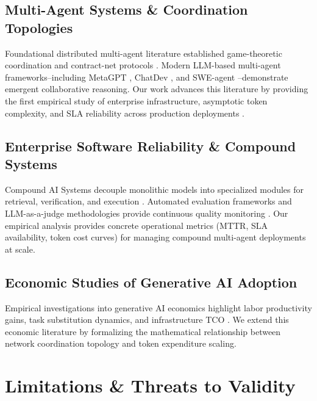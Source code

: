 \documentclass[10pt,twocolumn,letterpaper]{article}
\begin{document}
\subsection{Multi-Agent Systems \& Coordination Topologies}

Foundational distributed multi-agent literature established game-theoretic coordination and contract-net protocols \cite{arxiv_2203_08975,arxiv_2010_11146}. Modern LLM-based multi-agent frameworks--including MetaGPT \cite{arxiv_2412_06333}, ChatDev \cite{arxiv_2404_01131}, and SWE-agent \cite{arxiv_2405_01543}--demonstrate emergent collaborative reasoning. Our work advances this literature by providing the first empirical study of enterprise infrastructure, asymptotic token complexity, and SLA reliability across production deployments \cite{crossref_10_1201_9788743808145_14}.


\subsection{Enterprise Software Reliability \& Compound Systems}

Compound AI Systems decouple monolithic models into specialized modules for retrieval, verification, and execution \cite{arxiv_2406_00584,crossref_10_1109_access_2026_3656309}. Automated evaluation frameworks and LLM-as-a-judge methodologies provide continuous quality monitoring \cite{arxiv_2411_15594,arxiv_2302_10809}. Our empirical analysis provides concrete operational metrics (MTTR, SLA availability, token cost curves) for managing compound multi-agent deployments at scale.


\subsection{Economic Studies of Generative AI Adoption}

Empirical investigations into generative AI economics highlight labor productivity gains, task substitution dynamics, and infrastructure TCO \cite{crossref_10_1201_9788743808145_14,crossref_10_1108_jeim_12_2025_1269}. We extend this economic literature by formalizing the mathematical relationship between network coordination topology and token expenditure scaling.




\section{Limitations \& Threats to Validity}
\end{document}
